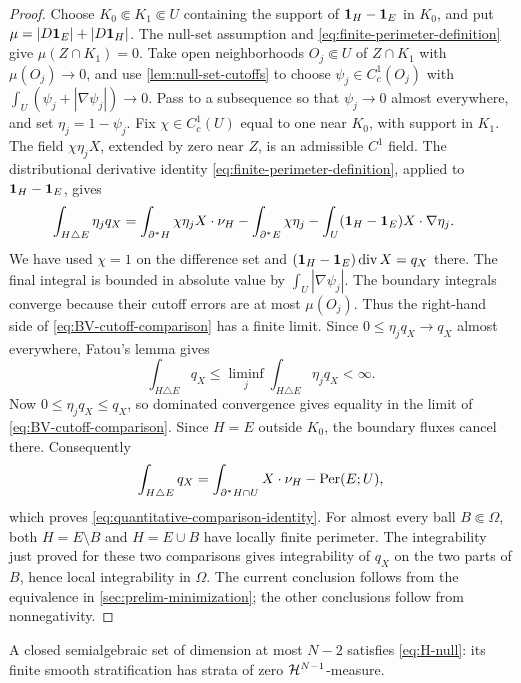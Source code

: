 \begin{proof}
Choose \(K_0\Subset K_1\Subset U\) containing the support of
\(\mathbf 1_H-\mathbf 1_E\) in \(K_0\), and put
\(\mu=|D\mathbf 1_E|+|D\mathbf 1_H|\).
The null-set assumption and \eqref{eq:finite-perimeter-definition}
give \(\mu(Z\cap K_1)=0\).
Take open neighborhoods \(O_j\Subset U\) of \(Z\cap K_1\) with
\(\mu(O_j)\to0\), and use \cref{lem:null-set-cutoffs} to choose
\(\psi_j\in C_c^1(O_j)\) with
\(\int_U(\psi_j+|\nabla\psi_j|)\to0\).
Pass to a subsequence so that \(\psi_j\to0\) almost everywhere, and set
\(\eta_j=1-\psi_j\).  Fix \(\chi\in C_c^1(U)\) equal to one near
\(K_0\), with support in \(K_1\).
The field \(\chi\eta_jX\), extended by zero near \(Z\), is an admissible
\(C^1\) field.  The distributional derivative identity
\eqref{eq:finite-perimeter-definition}, applied to
\(\mathbf 1_H-\mathbf 1_E\), gives
\begin{align}
 \int_{H\triangle E}\eta_jq_X
 &=\int_{\partial^*H}\chi\eta_j X\cdot\nu_H
   -\int_{\partial^*E}\chi\eta_j
   -\int_U(\mathbf 1_H-\mathbf 1_E)X\cdot\nabla\eta_j.
 \label{eq:BV-cutoff-comparison}
\end{align}
We have used \(\chi=1\) on the difference set and
\((\mathbf 1_H-\mathbf 1_E)\operatorname{div} X=q_X\) there.  The final integral is bounded in
absolute value by \(\int_U|\nabla\psi_j|\).
The boundary integrals converge because their cutoff errors are at most
\(\mu(O_j)\). Thus the right-hand side of
\eqref{eq:BV-cutoff-comparison} has a finite limit. Since
\(0\leq\eta_jq_X\to q_X\) almost everywhere, Fatou's lemma gives
\[
 \int_{H\triangle E}q_X
 \leq\liminf_j\int_{H\triangle E}\eta_jq_X<\infty.
\]
Now \(0\leq\eta_jq_X\leq q_X\), so dominated convergence gives
equality in the limit of \eqref{eq:BV-cutoff-comparison}.
Since \(H=E\) outside \(K_0\), the boundary fluxes cancel there.
Consequently
\[
 \int_{H\triangle E}q_X
 =\int_{\partial^*H\cap U}X\cdot\nu_H-\operatorname{Per}(E;U),
\]
which proves \eqref{eq:quantitative-comparison-identity}.
For almost every ball \(B\Subset\Omega\), both
\(H=E\setminus B\) and \(H=E\cup B\) have locally finite perimeter.
The integrability just proved for these two comparisons gives integrability
of \(q_X\) on the two parts of \(B\), hence local integrability in
\(\Omega\).  The current conclusion follows from the equivalence in
\cref{sec:prelim-minimization}; the other conclusions follow from
nonnegativity.
\end{proof}

\begin{remark}
A closed semialgebraic set of dimension at most \(N-2\) satisfies
\eqref{eq:H-null}: its finite smooth stratification
\cite[Sections~2.3 and~2.8]{BochnakCosteRoy98} has strata of zero
\(\mathcal H^{N-1}\)-measure.
\end{remark}

